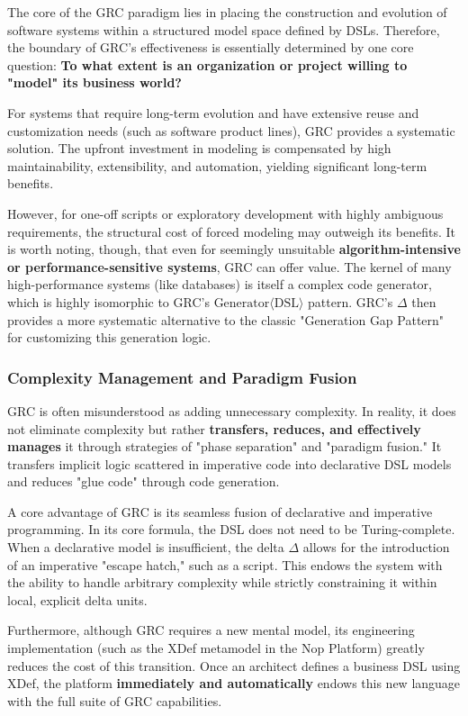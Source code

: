 \documentclass[11pt]{article}
\begin{document}
The core of the GRC paradigm lies in placing the construction and evolution of software systems within a structured model space defined by DSLs. Therefore, the boundary of GRC's effectiveness is essentially determined by one core question: \textbf{To what extent is an organization or project willing to "model" its business world?}

For systems that require long-term evolution and have extensive reuse and customization needs (such as software product lines), GRC provides a systematic solution. The upfront investment in modeling is compensated by high maintainability, extensibility, and automation, yielding significant long-term benefits.

However, for one-off scripts or exploratory development with highly ambiguous requirements, the structural cost of forced modeling may outweigh its benefits. It is worth noting, though, that even for seemingly unsuitable \textbf{algorithm-intensive or performance-sensitive systems}, GRC can offer value. The kernel of many high-performance systems (like databases) is itself a complex code generator, which is highly isomorphic to GRC's $\text{Generator}\langle\text{DSL}\rangle$ pattern. GRC's $\Delta$ then provides a more systematic alternative to the classic "Generation Gap Pattern" for customizing this generation logic.

\subsubsection{Complexity Management and Paradigm Fusion}

GRC is often misunderstood as adding unnecessary complexity. In reality, it does not eliminate complexity but rather \textbf{transfers, reduces, and effectively manages} it through strategies of "phase separation" and "paradigm fusion." It transfers implicit logic scattered in imperative code into declarative DSL models and reduces "glue code" through code generation.

A core advantage of GRC is its seamless fusion of declarative and imperative programming. In its core formula, the DSL does not need to be Turing-complete. When a declarative model is insufficient, the delta $\Delta$ allows for the introduction of an imperative "escape hatch," such as a script. This endows the system with the ability to handle arbitrary complexity while strictly constraining it within local, explicit delta units.

Furthermore, although GRC requires a new mental model, its engineering implementation (such as the XDef metamodel in the Nop Platform) greatly reduces the cost of this transition. Once an architect defines a business DSL using XDef, the platform \textbf{immediately and automatically} endows this new language with the full suite of GRC capabilities.
\end{document}

